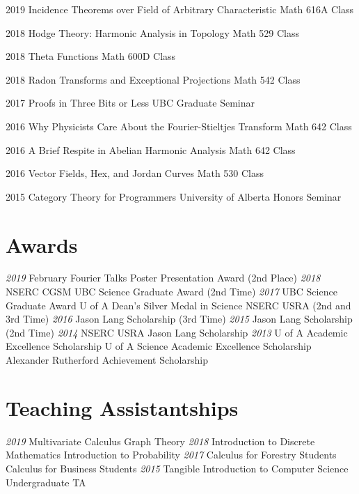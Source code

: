 \documentclass[a4paper]{cv-friggeri}
\begin{document}
\begin{entrylist}

\entry
{2019}
{Incidence Theorems over Field of Arbitrary Characteristic}
{Math 616A Class}
{}

\entry
{2018}
{Hodge Theory: Harmonic Analysis in Topology}
{Math 529 Class}
{}

\entry
{2018}
{Theta Functions}
{Math 600D Class}
{}

\entry
{2018}
{Radon Transforms and Exceptional Projections}
{Math 542 Class}
{}

\entry
{2017}
{Proofs in Three Bits or Less}
{UBC Graduate Seminar}
{}

\entry
{2016}
{Why Physicists Care About the Fourier-Stieltjes Transform}
{Math 642 Class}
{}

\entry
{2016}
{A Brief Respite in Abelian Harmonic Analysis}
{Math 642 Class}
{}

\entry
{2016}
{Vector Fields, Hex, and Jordan Curves}
{Math 530 Class}
{}

\entry
{2015}
{Category Theory for Programmers}
{University of Alberta Honors Seminar}
{}

\end{entrylist}

\begin{asidenotit}
\section{Awards}
\emph{2019}
February Fourier Talks Poster Presentation Award (2nd Place)
\emph{2018}
NSERC CGSM
UBC Science Graduate Award
(2nd Time)
\emph{2017}
UBC Science Graduate Award
U of A Dean's Silver Medal in Science
NSERC USRA
(2nd and 3rd Time)
\emph{2016}
Jason Lang Scholarship
(3rd Time)
\emph{2015}
Jason Lang Scholarship
(2nd Time)
\emph{2014}
NSERC USRA
Jason Lang Scholarship
\emph{2013}
U of A Academic Excellence Scholarship
U of A Science Academic Excellence Scholarship
Alexander Rutherford Achievement Scholarship
~
\section{Teaching Assistantships}
\emph{2019}
Multivariate Calculus
Graph Theory
\emph{2018}
Introduction to Discrete Mathematics
Introduction to Probability
\emph{2017}
Calculus for Forestry Students
Calculus for Business Students
\emph{2015}
Tangible Introduction to Computer Science Undergraduate TA
\end{asidenotit}
\end{document}

